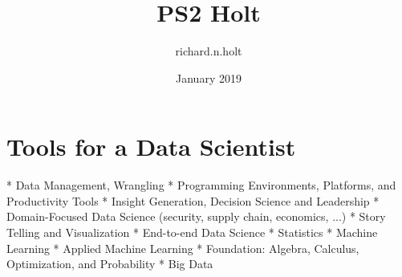 \documentclass{article}
\title{PS2 Holt}
\author{richard.n.holt }
\date{January 2019}
\begin{document}
\maketitle

\section{Tools for a Data Scientist}
* Data Management, Wrangling
* Programming Environments, Platforms, and Productivity Tools
* Insight Generation, Decision Science and Leadership
* Domain-Focused Data Science (security, supply chain, economics, ...)
* Story Telling and Visualization
* End-to-end Data Science
* Statistics
* Machine Learning
* Applied Machine Learning
* Foundation: Algebra, Calculus, Optimization, and Probability
* Big Data
\end{document}
